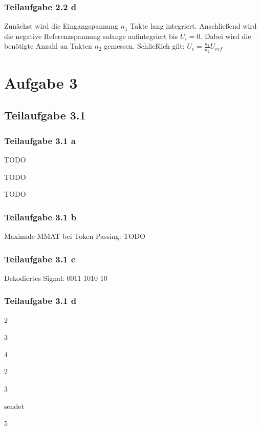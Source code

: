 \documentclass[a4paper]{scrartcl}
\begin{document}
  \subsubsection*{Teilaufgabe 2.2 d}
  Zunächst wird die Eingangspannung $n_1$ Takte lang integriert.
  Anschließend wird die negative Referenzspannung solange aufintegriert bis $U_i = 0$.
  Dabei wird die benötigte Anzahl an Takten $n_2$ gemessen.
  Schließlich gilt: $U_e = \frac{n_1}{n_2} U_{ref}$

  \section*{Aufgabe 3}
  \subsection*{Teilaufgabe 3.1}
  \subsubsection*{Teilaufgabe 3.1 a}
  \begin{enumerate*}[label=(\arabic*)]
      \item TODO
      \item TODO
      \item TODO
  \end{enumerate*}

  \subsubsection*{Teilaufgabe 3.1 b}
  Maximale MMAT bei Token Passing: TODO

  \subsubsection*{Teilaufgabe 3.1 c}
  Dekodiertes Signal: 0011 1010 10

  \subsubsection*{Teilaufgabe 3.1 d}
  \begin{enumerate*}[label=(l\arabic*)]
      \item 2
      \item 3
      \item 4
      \item 2
      \item 3
      \item sendet
      \item 5
  \end{enumerate*}
\end{document}
